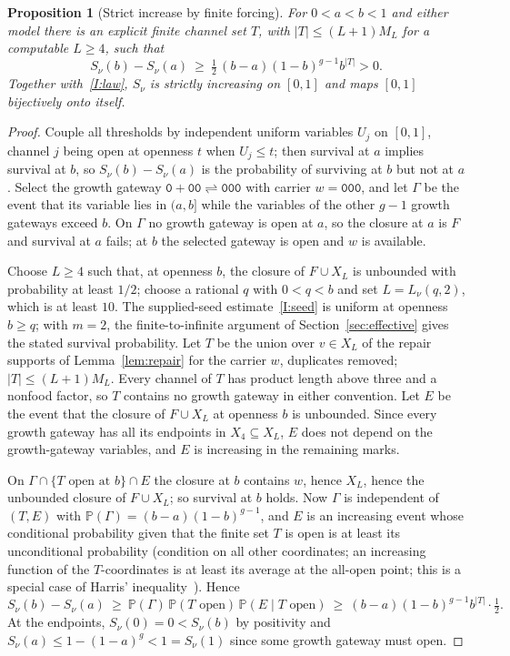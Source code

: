 \documentclass[11pt,a4paper]{article}
\theoremstyle{plain}
\newtheorem{proposition}[theorem]{Proposition}
\theoremstyle{definition}
\theoremstyle{remark}
\newcommand{\conventional}{\par\nopagebreak{\small\raggedright\textup{Conventional proof; not formalised.}\par}}
\newcommand{\Prob}{\mathbb{P}}
\newcommand{\word}[1]{\mathtt{#1}}
\begin{document}
\begin{proposition}[Strict increase by finite forcing]\label{prop:strict}
For $0<a<b<1$ and either model there is an explicit finite channel set $T$, with $|T|\le(L+1)M_L$ for a computable $L\ge4$, such that
\begin{equation}\label{eq:strict}
S_\nu(b)-S_\nu(a)\ \ge\ \tfrac12\,(b-a)(1-b)^{g-1}b^{|T|}>0 .
\end{equation}
Together with~\ref{I:law}, $S_\nu$ is strictly increasing on $[0,1]$ and maps $[0,1]$ bijectively onto itself.
\end{proposition}
\begin{proof}
Couple all thresholds by independent uniform variables $U_j$ on $[0,1]$, channel $j$ being open at openness $t$ when $U_j\le t$; then survival at $a$ implies survival at $b$, so $S_\nu(b)-S_\nu(a)$ is the probability of surviving at $b$ but not at $a$. Select the growth gateway $\word0+\word{00}\rightleftharpoons\word{000}$ with carrier $w=\word{000}$, and let $\Gamma$ be the event that its variable lies in $(a,b]$ while the variables of the other $g-1$ growth gateways exceed $b$. On $\Gamma$ no growth gateway is open at $a$, so the closure at $a$ is $F$ and survival at $a$ fails; at $b$ the selected gateway is open and $w$ is available.

Choose $L\ge4$ such that, at openness $b$, the closure of $F\cup X_L$ is unbounded with probability at least $1/2$; choose a rational $q$ with $0<q<b$ and set $L=L_\nu(q,2)$, which is at least $10$. The supplied-seed estimate~\ref{I:seed} is uniform at openness $b\ge q$; with $m=2$, the finite-to-infinite argument of Section~\ref{sec:effective} gives the stated survival probability. Let $T$ be the union over $v\in X_L$ of the repair supports of Lemma~\ref{lem:repair} for the carrier $w$, duplicates removed; $|T|\le(L+1)M_L$. Every channel of $T$ has product length above three and a nonfood factor, so $T$ contains no growth gateway in either convention. Let $E$ be the event that the closure of $F\cup X_L$ at openness $b$ is unbounded. Since every growth gateway has all its endpoints in $X_4\subseteq X_L$, $E$ does not depend on the growth-gateway variables, and $E$ is increasing in the remaining marks.

On $\Gamma\cap\{T\text{ open at }b\}\cap E$ the closure at $b$ contains $w$, hence $X_L$, hence the unbounded closure of $F\cup X_L$; so survival at $b$ holds. Now $\Gamma$ is independent of $(T,E)$ with $\Prob(\Gamma)=(b-a)(1-b)^{g-1}$, and $E$ is an increasing event whose conditional probability given that the finite set $T$ is open is at least its unconditional probability (condition on all other coordinates; an increasing function of the $T$-coordinates is at least its average at the all-open point; this is a special case of Harris' inequality~\cite{harris1960lower,grimmett1999percolation}). Hence
\[
S_\nu(b)-S_\nu(a)\ \ge\ \Prob(\Gamma)\,\Prob(T\text{ open})\,\Prob(E\mid T\text{ open})\ \ge\ (b-a)(1-b)^{g-1}b^{|T|}\cdot\tfrac12 .
\]
At the endpoints, $S_\nu(0)=0<S_\nu(b)$ by positivity and $S_\nu(a)\le1-(1-a)^{g}<1=S_\nu(1)$ since some growth gateway must open.
\end{proof}
\conventional
\end{document}
